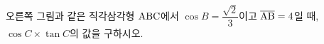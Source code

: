 \noindent\begin{minipage}[t]{0.58\linewidth}\vspace{0pt}\raggedright 오른쪽 그림과 같은 직각삼각형 $\mathrm{ABC}$에서 $\cos B=\dfrac{\sqrt{2}}{3}$이고 $\overline{\mathrm{AB}}=4$일 때, $\cos C\times\tan C$의 값을 구하시오.\end{minipage}\hfill\begin{minipage}[t]{0.4\linewidth}\vspace{0pt}\centering \resizebox{\ifdim\width>\linewidth\linewidth\else\width\fi}{!}{}\end{minipage}\par
